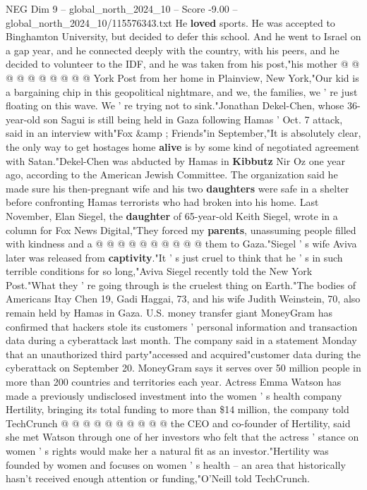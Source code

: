 \begin{textsample}{NEG Dim 9 – global\_north\_2024\_10 – Score -9.00 – global\_north\_2024\_10/115576343.txt}
He \textbf{loved} sports.
He was accepted to Binghamton University, but decided to defer this school.
And he went to Israel on a gap year, and he connected deeply with the country, with his peers, and he decided to volunteer to the IDF, and he was taken from his post,"his mother @ @ @ @ @ @ @ @ @ @ York Post from her home in Plainview, New York,"Our kid is a bargaining chip in this geopolitical nightmare, and we, the families, we ' re just floating on this wave.
We ' re trying not to sink."Jonathan Dekel-Chen, whose 36-year-old son Sagui is still being held in Gaza following Hamas ' Oct. 7 attack, said in an interview with"Fox \&amp ; Friends"in September,"It is absolutely clear, the only way to get hostages home \textbf{alive} is by some kind of negotiated agreement with Satan."Dekel-Chen was abducted by Hamas in \textbf{Kibbutz} Nir Oz one year ago, according to the American Jewish Committee.
The organization said he made sure his then-pregnant wife and his two \textbf{daughters} were safe in a shelter before confronting Hamas terrorists who had broken into his home.
Last November, Elan Siegel, the \textbf{daughter} of 65-year-old Keith Siegel, wrote in a column for Fox News Digital,"They forced my \textbf{parents}, unassuming people filled with kindness and a @ @ @ @ @ @ @ @ @ @ them to Gaza."Siegel ' s wife Aviva later was released from \textbf{captivity}."It ' s just cruel to think that he ' s in such terrible conditions for so long,"Aviva Siegel recently told the New York Post."What they ' re going through is the cruelest thing on Earth."The bodies of Americans Itay Chen 19, Gadi Haggai, 73, and his wife Judith Weinstein, 70, also remain held by Hamas in Gaza.
U.S. money transfer giant MoneyGram has confirmed that hackers stole its customers ' personal information and transaction data during a cyberattack last month.
The company said in a statement Monday that an unauthorized third party"accessed and acquired"customer data during the cyberattack on September 20.
MoneyGram says it serves over 50 million people in more than 200 countries and territories each year.
Actress Emma Watson has made a previously undisclosed investment into the women ' s health company Hertility, bringing its total funding to more than \$14 million, the company told TechCrunch @ @ @ @ @ @ @ @ @ @ the CEO and co-founder of Hertility, said she met Watson through one of her investors who felt that the actress ' stance on women ' s rights would make her a natural fit as an investor."Hertility was founded by women and focuses on women ' s health -- an area that historically hasn't received enough attention or funding,"O'Neill told TechCrunch.

\end{textsample}
